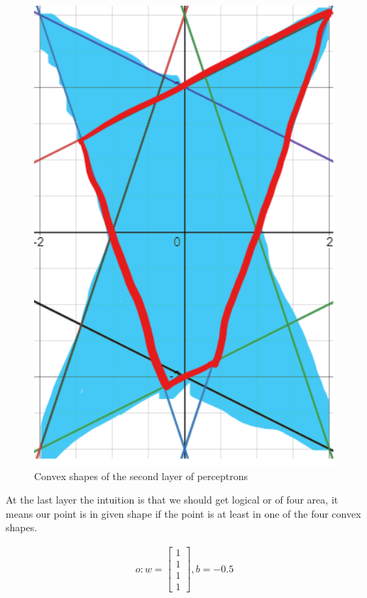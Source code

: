 \documentclass[en]{university}
\begin{document}
\begin{figure}[!htbp]
\centering
\includegraphics[width=1\textwidth]{assets/3convex.png}
\caption{Convex shapes of the second layer of perceptrons}
\label{fig:convex}
\end{figure}

At the last layer the intuition is that we should get logical or of four area, it means our point is in given shape if the point is at least in one 
of the four convex shapes. 

\begin{gather*}
    o: w = \begin{bmatrix}
        1 \\
        1 \\
        1 \\
        1 
    \end{bmatrix}, b = -0.5
\end{gather*}
\end{document}
